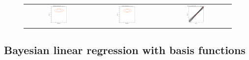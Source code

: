 \begin{frame}
\begin{figure}
\begin{tabular}{ccc}
    \includegraphics[width=0.3\textwidth]{images/plots/w_space_posterior_sequence_006_likelihood.pdf} &
    \includegraphics[width=0.3\textwidth]{images/plots/w_space_posterior_sequence_006_posterior.pdf} &
    \includegraphics[width=0.3\textwidth]{images/plots/w_space_posterior_sequence_006_posterior_models.pdf}
\end{tabular}
\end{figure}
\end{frame}


\subsection{Bayesian linear regression with basis functions}
\begin{frame}
\tableofcontents[currentsubsection]
\end{frame}


